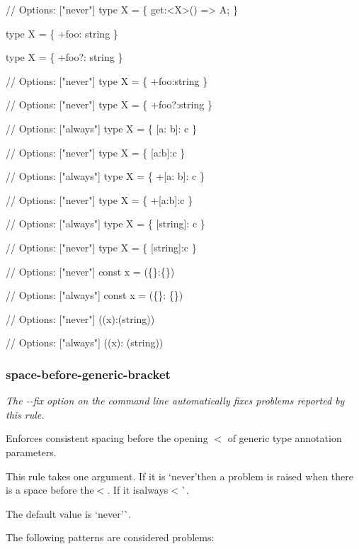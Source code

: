 \begin{DoxyCode}
// Options: ["never"]
type X = \{ get:<X>() => A; \}

type X = \{ +foo: string \}

type X = \{ +foo?: string \}

// Options: ["never"]
type X = \{ +foo:string \}

// Options: ["never"]
type X = \{ +foo?:string \}

// Options: ["always"]
type X = \{ [a: b]: c \}

// Options: ["never"]
type X = \{ [a:b]:c \}

// Options: ["always"]
type X = \{ +[a: b]: c \}

// Options: ["never"]
type X = \{ +[a:b]:c \}

// Options: ["always"]
type X = \{ [string]: c \}

// Options: ["never"]
type X = \{ [string]:c \}

// Options: ["never"]
const x = (\{\}:\{\})

// Options: ["always"]
const x = (\{\}: \{\})

// Options: ["never"]
((x):(string))

// Options: ["always"]
((x): (string))
\end{DoxyCode}


\label{_eslint-plugin-flowtype-rules-space-before-generic-bracket}%
 \subsubsection*{{\ttfamily space-\/before-\/generic-\/bracket}}

{\itshape The {\ttfamily -\/-\/fix} option on the command line automatically fixes problems reported by this rule.}

Enforces consistent spacing before the opening {\ttfamily $<$} of generic type annotation parameters.

This rule takes one argument. If it is `\textquotesingle{}never'{\ttfamily then a problem is raised when there is a space before the}$<${\ttfamily . If it is}\textquotesingle{}always$<$\`{}.

The default value is `\textquotesingle{}never'\`{}.

The following patterns are considered problems\+:


